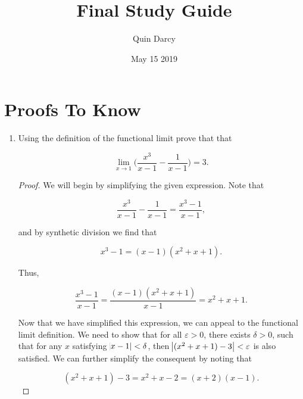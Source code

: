 \documentclass{article}
\theoremstyle{definition}
\theoremstyle{remark}
\theoremstyle{definition}
\begin{document}
\title{Final Study Guide}
\author{Quin Darcy}
\date{May 15 2019}
\maketitle

\section{Proofs To Know}

\begin{enumerate}[leftmargin=*]
    \item Using the definition of the functional limit prove that that
    
        \begin{equation*}
            \lim_{x\rightarrow 1}\bigg(\frac{x^3}{x-1}-\frac{1}{x-1}\bigg)=3.
        \end{equation*}
        
        \begin{proof}
            We will begin by simplifying the given expression. Note that 
            
            \begin{equation*}
                \frac{x^3}{x-1}-\frac{1}{x-1}=\frac{x^3-1}{x-1},
            \end{equation*}
            
            \noindent and by synthetic division we find that 
            
            \begin{equation*}
                x^3-1=(x-1)(x^2+x+1).
            \end{equation*}
            
            \noindent Thus, 
            
            \begin{equation*}
                \frac{x^3-1}{x-1}=\frac{(x-1)(x^2+x+1)}{x-1}=x^2+x+1.
            \end{equation*}
            
            \noindent Now that we have simplified this expression, we can appeal to the functional limit definition. We need to show that for all $\varepsilon>0$, there exists $\delta>0$, such that for any $x$ satisfying $\abs{x-1}<\delta$, then $\abs{(x^2+x+1)-3}<\varepsilon$ is also satisfied. We can further simplify the consequent by noting that 
            
            \begin{equation*}
                (x^2+x+1)-3=x^2+x-2=(x+2)(x-1).
            \end{equation*}
            

\end{proof}
\end{enumerate}
\end{document}
